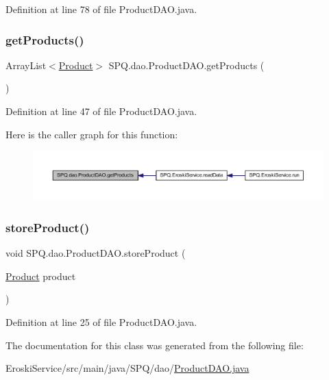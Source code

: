 Definition at line 78 of file Product\+D\+A\+O.\+java.

\mbox{\label{class_s_p_q_1_1dao_1_1_product_d_a_o_addd0016628e2b0db06969de5a944eace}} 
\subsubsection{\texorpdfstring{get\+Products()}{getProducts()}}
{\footnotesize\ttfamily Array\+List$<$\mbox{\hyperlink{class_s_p_q_1_1data_1_1_product}{Product}}$>$ S\+P\+Q.\+dao.\+Product\+D\+A\+O.\+get\+Products (\begin{DoxyParamCaption}{ }\end{DoxyParamCaption})}



Definition at line 47 of file Product\+D\+A\+O.\+java.

Here is the caller graph for this function\+:
\nopagebreak
\begin{figure}[H]
\begin{center}
\leavevmode
\includegraphics[width=350pt]{class_s_p_q_1_1dao_1_1_product_d_a_o_addd0016628e2b0db06969de5a944eace_icgraph}
\end{center}
\end{figure}
\mbox{\label{class_s_p_q_1_1dao_1_1_product_d_a_o_ae890d625011f3c28730259820c9f4f3c}} 
\subsubsection{\texorpdfstring{store\+Product()}{storeProduct()}}
{\footnotesize\ttfamily void S\+P\+Q.\+dao.\+Product\+D\+A\+O.\+store\+Product (\begin{DoxyParamCaption}\item[{\mbox{\hyperlink{class_s_p_q_1_1data_1_1_product}{Product}}}]{product }\end{DoxyParamCaption})}



Definition at line 25 of file Product\+D\+A\+O.\+java.



The documentation for this class was generated from the following file\+:\begin{DoxyCompactItemize}
\item 
Eroski\+Service/src/main/java/\+S\+P\+Q/dao/\mbox{\hyperlink{_product_d_a_o_8java}{Product\+D\+A\+O.\+java}}\end{DoxyCompactItemize}
